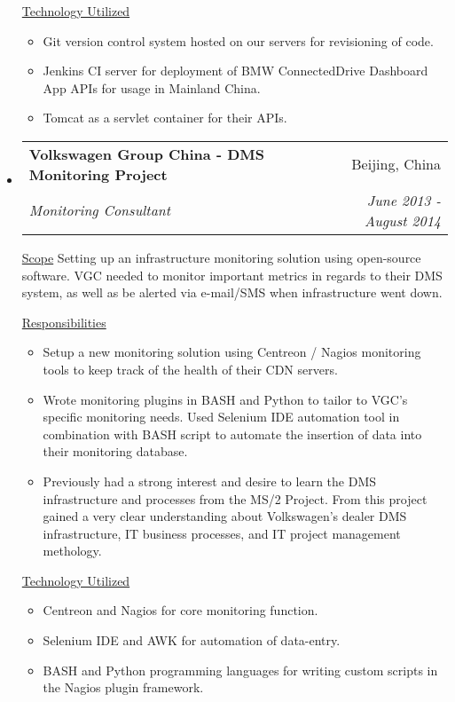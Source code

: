 \documentclass[a4paper,11pt]{article}
\makeatletter
\newcommand{\resitem}[1]{\item #1 \vspace{-2pt}}
\newcommand{\ressubheading}[4]{
\begin{tabular*}{6.5in}{l@{\cftdotfill{\cftsecdotsep}\extracolsep{\fill}}r}
        \textbf{#1} & #2 \\
        \textit{#3} & \textit{#4} \\
\end{tabular*}\vspace{-6pt}}
\makeatother
\begin{document}
\begin{itemize}
        \underline{Technology Utilized}
        \begin{itemize}
            \resitem{Git version control system hosted on our servers for revisioning of code.}
            \resitem{Jenkins CI server for deployment of BMW ConnectedDrive Dashboard App APIs for usage in Mainland China.}
            \resitem{Tomcat as a servlet container for their APIs.}
        \end{itemize}

    \item
        \ressubheading{Volkswagen Group China - DMS Monitoring Project}{Beijing, China}{Monitoring Consultant}{June 2013 - August 2014}
        \linebreak
        \linebreak

        \underline{Scope}
        \linebreak
        \linebreak
        Setting up an infrastructure monitoring solution using open-source software. VGC needed to monitor important metrics in regards to their DMS system, as well as be alerted via e-mail/SMS when infrastructure went down.

        \underline{Responsibilities}
        \begin{itemize}
            \resitem{Setup a new monitoring solution using Centreon / Nagios monitoring tools to keep track of the health of their CDN servers.}
            \resitem{Wrote monitoring plugins in BASH and Python to tailor to VGC's specific monitoring needs. Used Selenium IDE automation tool in combination with BASH script to automate the insertion of data into their monitoring database.}
            \resitem{Previously had a strong interest and desire to learn the DMS infrastructure and processes from the MS/2 Project. From this project gained a very clear understanding about Volkswagen's dealer DMS infrastructure, IT business processes, and IT project management methology.}
        \end{itemize}

        \underline{Technology Utilized}
        \begin{itemize}
            \resitem{Centreon and Nagios for core monitoring function.}
            \resitem{Selenium IDE and AWK for automation of data-entry.}
            \resitem{BASH and Python programming languages for writing custom scripts in the Nagios plugin framework.}
        \end{itemize}


\end{itemize}
\end{document}
